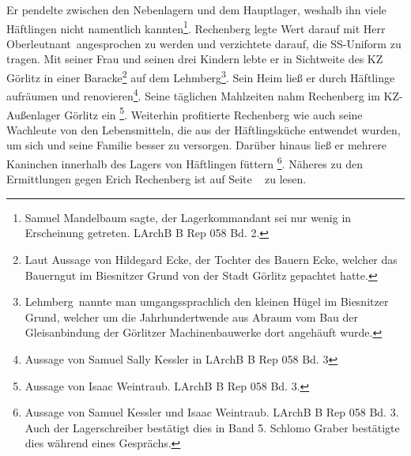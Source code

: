 \documentclass[a4paper,12pt,ngerman,
]{nisebook}
\begin{document}
Er pendelte zwischen den Nebenlagern und dem Hauptlager, weshalb ihn viele Häftlingen nicht namentlich kannten\footnote{Samuel Mandelbaum sagte, der Lagerkommandant sei nur wenig in Erscheinung getreten. LArchB B Rep 058 Bd. 2.}. Rechenberg legte Wert da\-rauf mit \glqq Herr Oberleutnant\grqq~angesprochen zu werden und verzichtete da\-rauf, die SS-Uniform zu tragen. Mit seiner Frau und seinen drei Kindern lebte er in Sichtweite des KZ Görlitz in einer Baracke\footnote{Laut Aussage von Hildegard Ecke, der Tochter des Bauern Ecke, welcher das Bauerngut im Biesnitzer Grund von der Stadt Görlitz gepachtet hatte.} auf dem \glqq Lehmberg\grqq\footnote{\glqq Lehmberg\grqq~nannte man umgangssprachlich den kleinen Hügel im Biesnitzer Grund, welcher um die Jahrhundertwende aus Abraum vom Bau der Gleisanbindung der Görlitzer Machinenbauwerke dort angehäuft wurde.}. Sein Heim ließ er durch Häftlinge aufräumen und renovieren\footnote{Aussage von Samuel Sally Kessler in LArchB B Rep 058 Bd. 3}. Seine täglichen Mahlzeiten nahm Rechenberg im KZ-Außenlager Görlitz ein
\footnote{Aussage von Isaac Weintraub. LArchB B Rep 058 Bd. 3.}. Weiterhin profitierte Rechenberg wie auch seine Wachleute von den Lebensmitteln, die aus der Häftlingsküche entwendet wurden, um sich und seine Familie besser zu versorgen. Darüber hinaus ließ er mehrere Kaninchen innerhalb des Lagers von Häftlingen füttern \footnote{Aussage von Samuel Kessler und Isaac Weintraub. LArchB B Rep 058 Bd. 3. Auch der Lagerschreiber bestätigt dies in Band 5. Schlomo Graber bestätigte dies während eines Gesprächs.}. Näheres zu den Ermittlungen gegen Erich Rechenberg ist auf Seite ~\pageref{rechenberg_ahndung} zu lesen.
\end{document}
